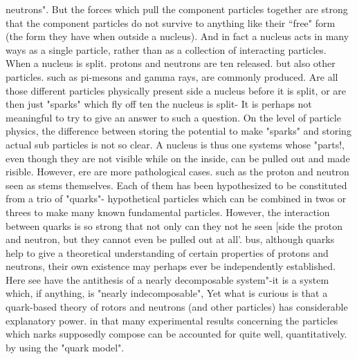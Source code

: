        neutrons". But the forces which pull the component particles together are strong
       that the component particles do not survive to anything like their “free" form (the
       form they have when outside a nucleus). And in fact a nucleus acts in many ways
       as a single particle, rather than as a collection of interacting particles. When a
       nucleus is split. protons and neutrons are ten released. but also other particles.
       such as pi-mesons and gamma rays, are commonly produced. Are all those
       different particles physically present side a nucleus before it is split, or are then
       just "sparks" which fly off ten the nucleus is split- It is perhaps not meaningful to
       try to give an answer to such a question. On the level of particle physics, the
       difference between storing the potential to make "sparks" and storing actual sub
       particles is not so clear.
               A nucleus is thus one systems whose "parts!, even though they are not
       visible while on the inside, can be pulled out and made risible. However, ere are
       more pathological cases. such as the proton and neutron seen as stems themselves.
       Each of them has been hypothesized to be constituted from a trio of "quarks"-
       hypothetical particles which can be combined in twos or threes to make many
       known fundamental particles. However, the interaction between quarks is so
       strong that not only can they not he seen [side the proton and neutron, but they
       cannot even be pulled out at all'. bus, although quarks help to give a theoretical
       understanding of certain properties of protons and neutrons, their own existence
       may perhaps ever be independently established. Here see have the antithesis of a
       nearly decomposable system"-it is a system which, if anything, is "nearly
       indecomposable", Yet what is curious is that a quark-based theory of rotors and
       neutrons (and other particles) has considerable explanatory power. in that many
       experimental results concerning the particles which narks supposedly compose
       can be accounted for quite well, quantitatively. by using the "quark model".

